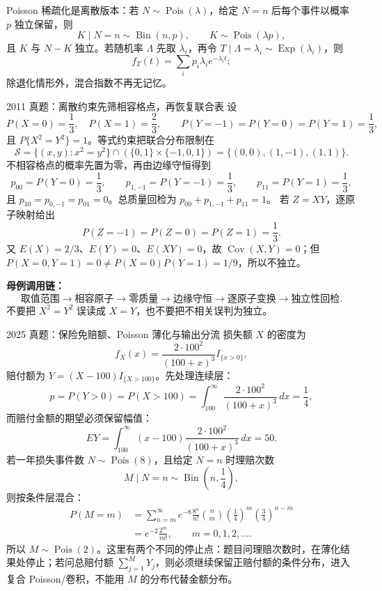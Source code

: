\documentclass[11pt,a4paper]{ctexart}
\newcommand{\kw}[1]{\textbf{\color{deep}#1}}
\begin{document}
Poisson 稀疏化是离散版本：若 $N\sim\operatorname{Pois}(\lambda)$，给定 $N=n$ 后每个事件以概率 $p$ 独立保留，则
\[
K\mid N=n\sim\operatorname{Bin}(n,p),\qquad K\sim\operatorname{Pois}(\lambda p),
\]
且 $K$ 与 $N-K$ 独立。若随机率 $\Lambda$ 先取 $\lambda_i$，再令 $T\mid\Lambda=\lambda_i\sim\operatorname{Exp}(\lambda_i)$，则
\[
f_T(t)=\sum_ip_i\lambda_ie^{-\lambda_it};
\]
除退化情形外，混合指数不再无记忆。

\begin{examplebox}{2011 真题：离散约束先筛相容格点，再恢复联合表}
设
\[
P(X=0)=\frac13,\quad P(X=1)=\frac23,
\qquad P(Y=-1)=P(Y=0)=P(Y=1)=\frac13,
\]
且 $P\{X^2=Y^2\}=1$。等式约束把联合分布限制在
\[
\mathcal S=\{(x,y):x^2=y^2\}\cap(\{0,1\}\times\{-1,0,1\})
 =\{(0,0),(1,-1),(1,1)\}.
\]
不相容格点的概率先置为零，再由边缘守恒得到
\[
p_{00}=P(Y=0)=\frac13,\qquad
p_{1,-1}=P(Y=-1)=\frac13,\qquad
p_{11}=P(Y=1)=\frac13,
\]
且 $p_{10}=p_{0,-1}=p_{01}=0$。总质量回检为 $p_{00}+p_{1,-1}+p_{11}=1$。
若 $Z=XY$，逐原子映射给出
\[
P(Z=-1)=P(Z=0)=P(Z=1)=\frac13.
\]
又 $E(X)=2/3$、$E(Y)=0$、$E(XY)=0$，故 $\operatorname{Cov}(X,Y)=0$；但
$P(X=0,Y=1)=0\ne P(X=0)P(Y=1)=1/9$，所以不独立。

\kw{母例调用链：}
\[
\boxed{\text{取值范围}\to\text{相容原子}\to\text{零质量}\to\text{边缘守恒}\to\text{逐原子变换}\to\text{独立性回检}.}
\]
不要把 $X^2=Y^2$ 误读成 $X=Y$，也不要把不相关误判为独立。
\end{examplebox}

\begin{examplebox}{2025 真题：保险免赔额、Poisson 薄化与输出分流}
损失额 $X$ 的密度为
\[
f_X(x)=\frac{2\cdot100^2}{(100+x)^3}I_{\{x>0\}},
\]
赔付额为 $Y=(X-100)I_{\{X>100\}}$。先处理连续层：
\[
p=P(Y>0)=P(X>100)=\int_{100}^{\infty}
\frac{2\cdot100^2}{(100+x)^3}\,dx=\frac14,
\]
而赔付金额的期望必须保留幅值：
\[
EY=\int_{100}^{\infty}(x-100)\frac{2\cdot100^2}{(100+x)^3}\,dx=50.
\]
若一年损失事件数 $N\sim\operatorname{Pois}(8)$，且给定 $N=n$ 时理赔次数
\[
M\mid N=n\sim\operatorname{Bin}\left(n,\frac14\right),
\]
则按条件层混合：
\[
\begin{aligned}
P(M=m)
&=\sum_{n=m}^{\infty}e^{-8}\frac{8^n}{n!}\binom nm
 \left(\frac14\right)^m\left(\frac34\right)^{n-m}\\
&=e^{-2}\frac{2^m}{m!},\qquad m=0,1,2,\ldots.
\end{aligned}
\]
所以 $M\sim\operatorname{Pois}(2)$。这里有两个不同的停止点：题目问理赔次数时，在薄化结果处停止；若问总赔付额 $\sum_{j=1}^{M}Y_j$，则必须继续保留正赔付额的条件分布，进入复合 Poisson/卷积，不能用 $M$ 的分布代替金额分布。
\end{examplebox}
\end{document}
